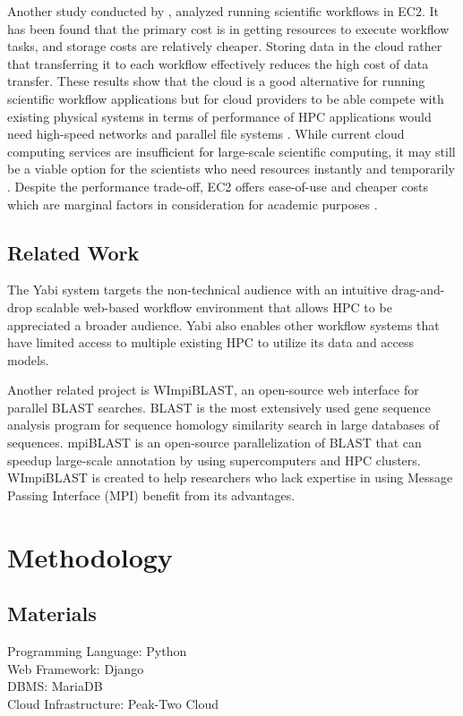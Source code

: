 \documentclass[journal]{./IEEE/IEEEtran}
\begin{document}
         Another study conducted by \cite{SciWorkflowEC2}, analyzed running scientific workflows in EC2. It has been found that the primary cost is in getting resources to execute workflow tasks, and storage costs are relatively cheaper. Storing data in the cloud rather that transferring it to each workflow effectively reduces the high cost of data transfer. These results show that the cloud is a good alternative for running scientific workflow applications but for cloud providers to be able compete with existing physical systems in terms of performance of HPC applications would need high-speed networks and parallel file systems \cite{SciWorkflowEC2}\cite{WalkerEC2HPC}. While current cloud computing services are insufficient for large-scale scientific computing, it may still be a viable option for the scientists who need resources instantly and temporarily \cite{PerfAnalysisManyTasks}. Despite the performance trade-off, EC2 offers ease-of-use and cheaper costs which are marginal factors in consideration for academic purposes \cite{ZachHumphrey}.
    \subsection {Related Work}
        The Yabi system \cite{7411021620120101} targets the non-technical audience with an intuitive drag-and-drop scalable web-based workflow environment that allows HPC to be appreciated a broader audience. Yabi also enables other workflow systems that have limited access to multiple existing HPC to utilize its data and access models.
        
	Another related project is WImpiBLAST\cite{9686120720140601}, an open-source web interface for parallel BLAST searches. BLAST is the most extensively used gene sequence analysis program for sequence homology similarity search in large databases of sequences. mpiBLAST is an open-source parallelization of BLAST that can speedup large-scale annotation by using supercomputers and HPC clusters. WImpiBLAST is created to help researchers who lack expertise in using Message Passing Interface (MPI) benefit from its advantages.     
        
        
\section{Methodology}
   \subsection {Materials}
    \begin{description}
      \item[Programming Language: Python ]
      \item[Web Framework: Django ]
      \item[DBMS: MariaDB]
      \item[Cloud Infrastructure: Peak-Two Cloud ]
    \end{description}
\end{document}
